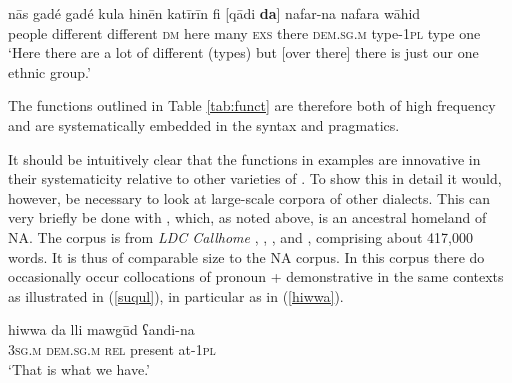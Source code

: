 \documentclass[output=paper]{langsci/langscibook}
\begin{document}
\ea\label{nas}
\gll nās gadé gadé kula hinēn katīrīn fi [qādi \textbf{da}] nafar-na nafara wāhid\\
     people different different \textsc{dm} here many \textsc{exs} there \textsc{dem.sg.m} type-\textsc{1pl} type one\\
\glt ‘Here there are a lot of different (types) but [over there] there is just our one ethnic group.’
\z

The functions outlined in Table \ref{tab:funct} are therefore both of high {frequency} and are systematically embedded in the syntax and pragmatics.

It should be intuitively clear that the functions in examples  are innovative in their systematicity {relative} to other varieties of . To show this in detail it would, however, be necessary to look at large-scale corpora of other  dialects. This can very briefly be done with , which, as noted above, is an ancestral homeland of NA. The  corpus is from \textit{LDC Callhome} \citep{Canavanetal1997}, \citet{Nakano1982}, \citet{BehnstedtWoidich1987}, and \citet{WoidichDrop2007}, comprising about 417,000 words. It is thus of comparable size to the NA corpus. In this corpus there do occasionally occur collocations of pronoun + demonstrative in the same contexts as illustrated in (\ref{suqul}), in particular as in (\ref{hiwwa}).


\ea\label{hiwwa}
\gll hiwwa da lli mawgūd ʕandi-na\\
     \textsc{3sg.m} \textsc{dem.sg.m} \textsc{rel} present at-1\textsc{pl}\\
\glt ‘That is what we have.’
\z
\end{document}
